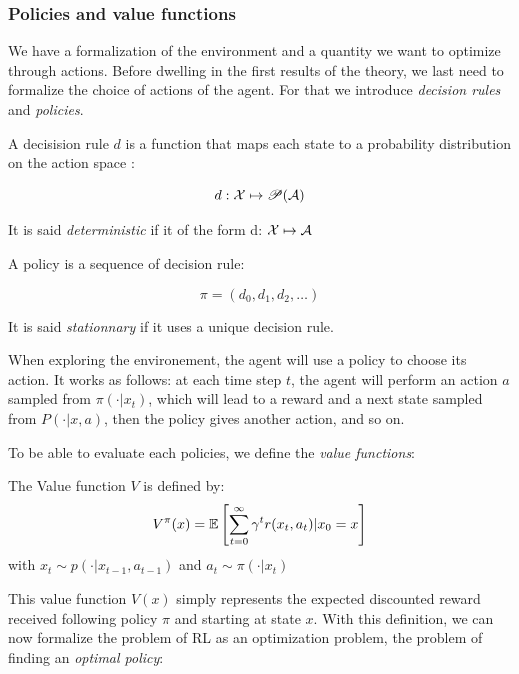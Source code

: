 \subsubsection*{Policies and value functions}

We have a formalization of the environment and a quantity we want to optimize through actions. Before dwelling in the first results of the theory, we last need to formalize the choice of actions of the agent. For that we introduce \emph{decision rules} and \emph{policies}. 

\begin{definition}
    A decisision rule $d$ is a function that maps each state to a probability distribution on the action space :
    
    \[ d: \mathcal{X} \mapsto \mathscr{P}(\mathcal{A}) \]

    It is said \emph{deterministic} if it of the form d: $\mathcal{X} \mapsto \mathcal{A}$ \\
\end{definition}

\begin{definition}
    A policy is a sequence of decision rule: 

    \[ \pi = (d_0, d_1, d_2, \dots) \]

    It is said \emph{stationnary} if it uses a unique decision rule.
\end{definition}

When exploring the environement, the agent will use a policy to choose its action. It works as follows: at each time step $t$, the agent will perform an action $a$ sampled from $\pi(\cdot | x_t)$, which will lead to a reward and a next state sampled from $P(\cdot |x,a)$, then the policy gives another action, and so on.

To be able to evaluate each policies, we define the \emph{value functions}:

\begin{definition}
    The Value function $V$ is defined by:
    \[ V^\pi(x) = \mathbb{E}\left[ \sum_{t=0}^\infty  \gamma^t r(x_t, a_t) | x_0 = x \right]  \]
    with $x_t \sim p(\cdot | x_{t-1}, a_{t-1})$ and $a_t \sim \pi(\cdot | x_t)$
\end{definition}

This value function $V(x)$ simply represents the expected discounted reward received following policy $\pi$ and starting at state $x$. With this definition, we can now formalize the problem of RL as an optimization problem, the problem of finding an \emph{optimal policy}:

